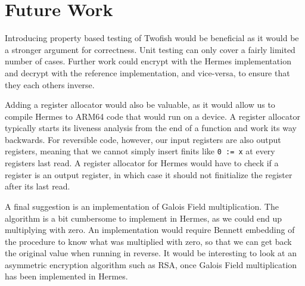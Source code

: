 \section{Future Work}
Introducing property based testing of Twofish would be beneficial as it would be a stronger argument for correctness. Unit testing can only cover a fairly limited number of cases. Further work could encrypt with the Hermes implementation and decrypt with the reference implementation, and vice-versa, to ensure that they each others inverse.

Adding a register allocator would also be valuable, as it would allow us to compile Hermes to ARM64 code that would run on a device. A register allocator typically starts its liveness analysis from the end of a function and work its way backwards. For reversible code, however, our input registers are also output registers, meaning that we cannot simply insert finits like \lstinline{0 := x} at every registers last read. A register allocator for Hermes would have to check if a register is an output register, in which case it should not finitialize the register after its last read.

A final suggestion is an implementation of Galois Field multiplication.
The algorithm is a bit cumbersome to implement in Hermes, as we could end up multiplying with zero. An implementation would require Bennett embedding of the procedure to know what was multiplied with zero, so that we can get back the original value when running in reverse.
It would be interesting to look at an asymmetric encryption algorithm such as RSA, once Galois Field multiplication has been implemented in Hermes.
